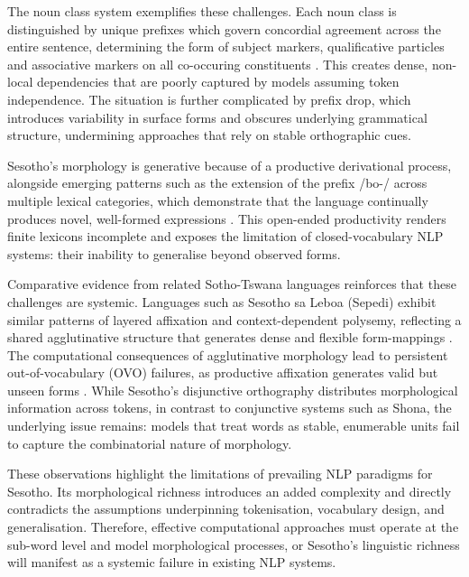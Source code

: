 \documentclass[11pt,a4paper]{article}
\begin{document}
The noun class system exemplifies these challenges. Each noun class is distinguished by unique prefixes which govern concordial agreement across the entire sentence, determining the form of subject markers, qualificative particles and associative markers on all co-occuring constituents \citep{mokoaleli2020sesotho}. This creates dense, non-local dependencies that are poorly captured by models assuming token independence. The situation is further complicated by prefix drop, which introduces variability in surface forms and obscures underlying grammatical structure, undermining approaches that rely on stable orthographic cues.

Sesotho's morphology is generative because of a productive derivational process, alongside emerging patterns such as the extension of the prefix /bo-/ across multiple lexical categories, which demonstrate that the language continually produces novel, well-formed expressions \citep{mokoaleli2020sesotho,moloi2014morphology}. This open-ended productivity renders finite lexicons incomplete and exposes the limitation of closed-vocabulary NLP systems: their inability to generalise beyond observed forms.

Comparative evidence from related Sotho-Tswana languages reinforces that these challenges are systemic. Languages such as Sesotho sa Leboa (Sepedi) exhibit similar patterns of layered affixation and context-dependent polysemy, reflecting a shared agglutinative structure that generates dense and flexible form-mappings \citep{masethe2022word}. The computational consequences of agglutinative morphology lead to persistent out-of-vocabulary (OVO) failures, as productive affixation generates valid but unseen forms \citep{kambarami2021out}. While Sesotho's disjunctive orthography distributes morphological information across tokens, in contrast to conjunctive systems such as Shona, the underlying issue remains: models that treat words as stable, enumerable units fail to capture the combinatorial nature of morphology.

These observations highlight the limitations of prevailing NLP paradigms for Sesotho. Its morphological richness introduces an added complexity and directly contradicts the assumptions underpinning tokenisation, vocabulary design, and generalisation. Therefore, effective computational approaches must operate at the sub-word level and model morphological processes, or Sesotho's linguistic richness will manifest as a systemic failure in existing NLP systems.
\end{document}
